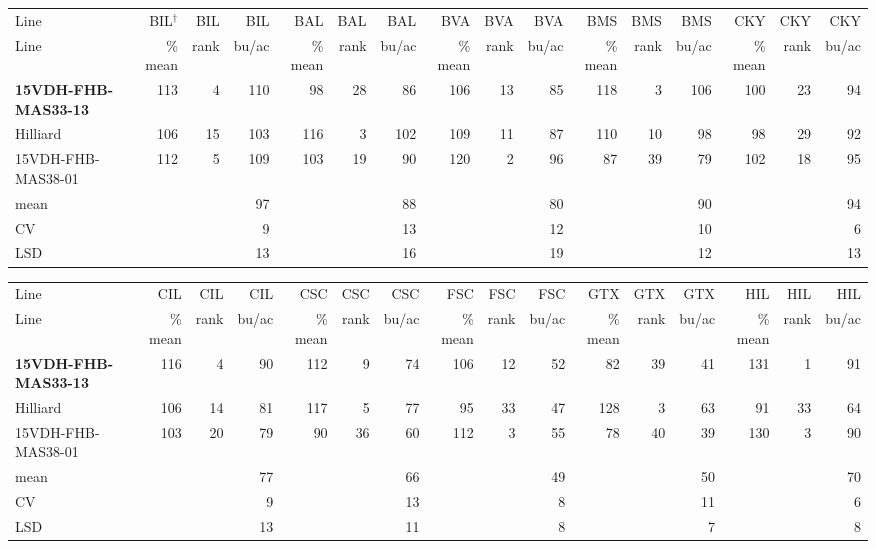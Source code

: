 \documentclass[12pt, letterpaper]{article}
\begin{document}
\begin{landscape}
\begin{table}
\begin{tabular}{|l|rrr|rrr|rrr|rrr|rrr|}
  \hline
Line & BIL$^\dagger$ & BIL & BIL & BAL & BAL & BAL & BVA & BVA & BVA & BMS & BMS & BMS & CKY & CKY & CKY \\ 
Line & \% mean & rank & bu/ac & \% mean & rank & bu/ac & \% mean & rank & bu/ac & \% mean & rank & bu/ac & \% mean & rank & bu/ac \\ 
  \hline
  \textbf{15VDH-FHB-MAS33-13} & 113 &   4 & 110 &  98 &  28 &  86 & 106 &  13 &  85 & 118 &   3 & 106 & 100 &  23 &  94 \\ 
  Hilliard & 106 &  15 & 103 & 116 &   3 & 102 & 109 &  11 &  87 & 110 &  10 &  98 &  98 &  29 &  92 \\ 
  15VDH-FHB-MAS38-01 & 112 &   5 & 109 & 103 &  19 &  90 & 120 &   2 &  96 &  87 &  39 &  79 & 102 &  18 &  95 \\ 
  mean &  &  &  97 &  &  &  88 &  &  &  80 &  &  &  90 &  &  &  94 \\ 
  CV &  &  &   9 &  &  &  13 &  &  &  12 &  &  &  10 &  &  &   6 \\ 
  LSD &  &  &  13 &  &  &  16 &  &  &  19 &  &  &  12 &  &  &  13 \\ 
   \hline
\end{tabular}

\bigskip

\begin{tabular}{|l|rrr|rrr|rrr|rrr|rrr|}
  \hline
Line & CIL & CIL & CIL & CSC & CSC & CSC & FSC & FSC & FSC & GTX & GTX & GTX & HIL & HIL & HIL \\ 
Line & \% mean & rank & bu/ac & \% mean & rank & bu/ac & \% mean & rank & bu/ac & \% mean & rank & bu/ac & \% mean & rank & bu/ac \\ 
  \hline
\textbf{15VDH-FHB-MAS33-13} & 116 &   4 &  90 & 112 &   9 &  74 & 106 &  12 &  52 &  82 &  39 &  41 & 131 &   1 &  91 \\ 
  Hilliard & 106 &  14 &  81 & 117 &   5 &  77 &  95 &  33 &  47 & 128 &   3 &  63 &  91 &  33 &  64 \\ 
  15VDH-FHB-MAS38-01 & 103 &  20 &  79 &  90 &  36 &  60 & 112 &   3 &  55 &  78 &  40 &  39 & 130 &   3 &  90 \\ 
  mean &  &  &  77 &  &  &  66 &  &  &  49 &  &  &  50 &  &  &  70 \\ 
  CV &  &  &   9 &  &  &  13 &  &  &   8 &  &  &  11 &  &  &   6 \\ 
  LSD &  &  &  13 &  &  &  11 &  &  &   8 &  &  &   7 &  &  &   8 \\ 
   \hline
\end{tabular}


\end{table}
\end{landscape}
\end{document}
